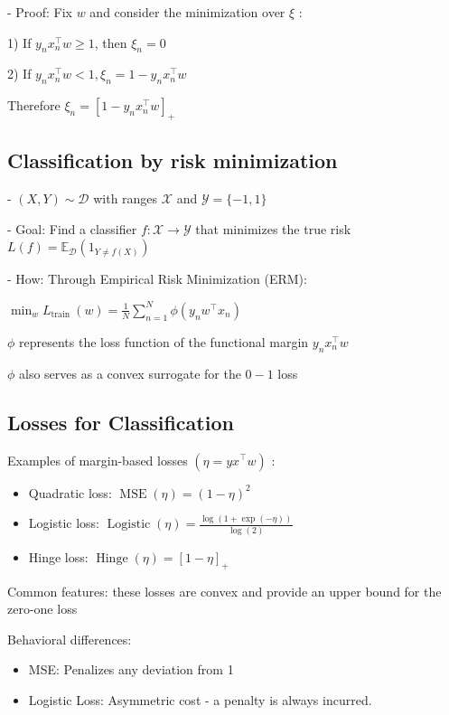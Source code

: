  
- Proof: Fix $w$ and consider the minimization over $\xi$ :

1) If $y_{n} x_{n}^{\top} w \geq 1$, then $\xi_{n}=0$

2) If $y_{n} x_{n}^{\top} w<1, \xi_{n}=1-y_{n} x_{n}^{\top} w$

Therefore $\xi_{n}=\left[1-y_{n} x_{n}^{\top} w\right]_{+}$


\subsection*{Classification by risk minimization}
- $(X, Y) \sim \mathscr{D}$ with ranges $\mathscr{X}$ and $\mathscr{Y}=\{-1,1\}$

- Goal: Find a classifier $f: \mathscr{X} \rightarrow \mathcal{Y}$ that minimizes the true risk
$
L(f)=\mathbb{E}_{\mathscr{D}}\left(1_{Y \neq f(X)}\right)
$

- How: Through Empirical Risk Minimization (ERM):

$
\min _{w} L_{\text {train }}(w)=\frac{1}{N} \sum_{n=1}^{N} \phi\left(y_{n} w^{\top} x_{n}\right)
$

$\phi$ represents the loss function of the functional margin $y_{n} x_{n}^{\top} w$

$\phi$ also serves as a convex surrogate for the $0-1$ loss

\subsection*{Losses for Classification}
Examples of margin-based losses $\left(\eta=y x^{\top} w\right)$ :

\begin{itemize}
  \item Quadratic loss: $\operatorname{MSE}(\eta)=(1-\eta)^{2}$
  \item Logistic loss: $\operatorname{Logistic}(\eta)=\frac{\log (1+\exp (-\eta))}{\log (2)}$
  \item Hinge loss: $\operatorname{Hinge}(\eta)=[1-\eta]_{+}$
\end{itemize}

Common features: these losses are convex and provide an upper bound for the zero-one loss

Behavioral differences:

\begin{itemize}
  \item MSE: Penalizes any deviation from 1
  \item Logistic Loss: Asymmetric cost - a penalty is always incurred.
\end{itemize}


